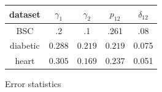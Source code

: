 \begin{figure}
	\begin{minipage}{5cm}
		\small
		\hspace{-1cm}
	\begin{tabular}[c]{c|c|c|c|c } 
		\label{tab:ErrorTable}
		dataset & $\gamma_1$ & $\gamma_2$ & $p_{12}$ & $\delta_{12}$\\ \hline 
		BSC & .2 & .1 & .261 & .08\\  \hline
		diabetic & $0.288 $ & $ 0.219$ & $ 0.219$ & 0.075\\  \hline
		heart & $0.305$ & $0.169$ & $0.237$ & 0.051\\  \hline
	\end{tabular}
		\caption{Error statistics}
	\end{minipage}  \hspace{1cm}
	\begin{minipage}{8cm}
		\vspace{-1cm}
		\centering

\end{minipage}
\end{figure}

